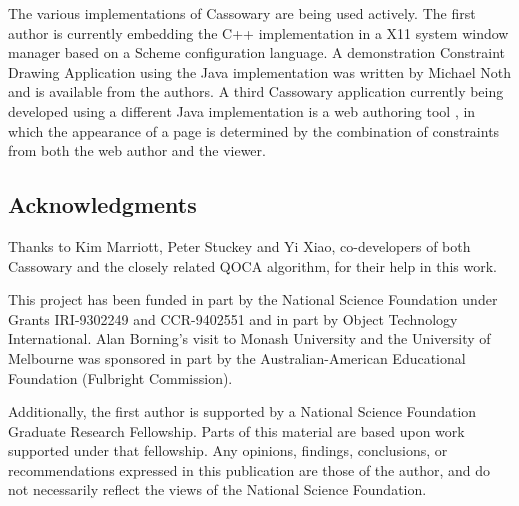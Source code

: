 \documentclass{article}
\begin{document}
The various implementations of Cassowary are being used actively.  The
first author is currently embedding the C++ implementation in a X11
system window manager based on a Scheme configuration language. A
demonstration Constraint Drawing Application using the Java
implementation was written by Michael Noth and is available from the
authors.  A third Cassowary application currently being developed using
a different Java implementation is a web authoring tool
\cite{borning-multimedia-97}, in which the appearance of a page is
determined by the combination of constraints from both the web author
and the viewer.

\subsection*{Acknowledgments}

Thanks to Kim Marriott, Peter Stuckey and Yi Xiao, co-developers of both
Cassowary and the closely related QOCA algorithm, for their help in this
work.

This project has been funded in part by the National Science Foundation
under Grants \mbox{IRI-9302249} and \mbox{CCR-9402551} and in part by Object
Technology International.  Alan Borning's visit to Monash University and
the University of Melbourne was sponsored in part by the
Australian-American Educational Foundation (Fulbright Commission).

Additionally, the first author is supported by a National Science Foundation
Graduate Research Fellowship.  Parts of this material are based upon
work supported under that fellowship.  Any opinions, findings,
conclusions, or recommendations expressed in this publication are those
of the author, and do not necessarily reflect the views of the National
Science Foundation.



\end{document}
